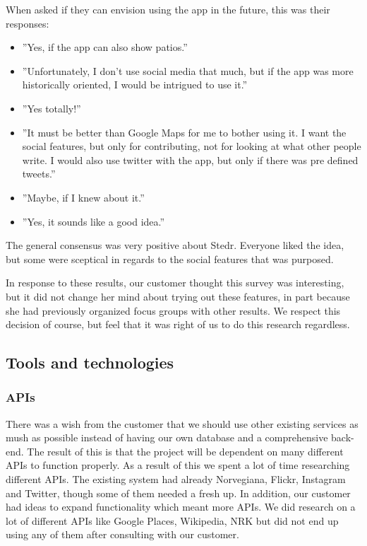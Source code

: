 	When asked if they can envision using the app in the future, this was their responses:
\begin{itemize}
	\item ”Yes, if the app can also show patios.”
	\item ”Unfortunately, I don't use social media that much, but if the app was more historically oriented, I would be intrigued to use it.”
	\item ”Yes totally!”
	\item ”It must be better than Google Maps for me to bother using it. I want the social features, but only for contributing, not for looking at what other people write. I would also use twitter with the app, but only if there was pre defined tweets.”
	\item”Maybe, if I knew about it.”
	\item ”Yes, it sounds like a good idea.”
\end{itemize}

	The general consensus was very positive about Stedr. Everyone liked the idea, but some were sceptical in regards to the social features that was purposed.

	In response to these results, our customer thought this survey was interesting, but it did not change her mind about trying out these features, in part because she had previously organized focus groups with other results. We respect this decision of course, but feel that it was right of us to do this research regardless.
	
	\subsection{Tools and technologies}
	
		\subsubsection{APIs}
		

		There was a wish from the customer that we should use other existing services as mush as possible instead of having our own database and a comprehensive back-end. The result of this is that the project will be dependent on many different APIs to function properly. As a result of this we spent a lot of time researching different APIs. The existing system had already Norvegiana, Flickr, Instagram and Twitter, though some of them needed a fresh up. In addition, our customer had ideas to expand functionality which meant more APIs. We did research on a lot of different APIs like Google Places, Wikipedia, NRK but did not end up using any of them after consulting with our customer. 
		
